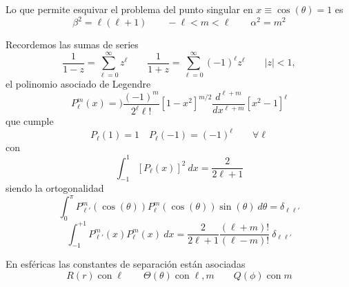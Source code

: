 \documentclass[10pt,oneside]{CBFT_book}
\begin{document}
Lo que permite esquivar el problema del punto singular en $x \equiv \cos(\theta)=1$ es
\[
	\beta^2 = \ell(\ell + 1) \qquad - \ell < m < \ell \qquad \alpha^2 = m^2
\]

Recordemos las sumas de series
\[
	\frac{1}{1-z} = \sum_{\ell=0}^{\infty} z^\ell \qquad \frac{1}{1+z} = \sum_{\ell=0}^{\infty} (-1)^\ell 
	z^\ell	\qquad |z|<1,
\]
el polinomio asociado de Legendre
\[
	P_\ell^m (x) =) \frac{(-1)^m}{2^\ell \ell!} [1-x^2]^{m/2} \frac{d^{\ell + m}}{dx^{\ell + m}} 
			[x^2 -1]^\ell
\]
que cumple
\[
	P_\ell (1) = 1 \quad P_\ell (-1) = (-1)^\ell \qquad  \forall \ell
\]
con 
\[
	\int_{-1}^1 [P_\ell (x)]^2 \: dx = \frac{2}{ 2\ell + 1 }
\]
siendo la ortogonalidad
\[
	\int_0^\pi P_{\ell'}^m (\cos(\theta)) P_\ell^m (\cos(\theta)) \sin(\theta) \: d\theta = 
	\delta_{\ell\ell'}
\]
\[
	\int_{-1}^{+1} P_{\ell'}^m (x) P_\ell^m (x) \: dx= \frac{2}{2\ell + 1}
	\frac{(\ell + m)!}{(\ell - m)!} \: \delta_{\ell\ell'}
\]

En esféricas las constantes de separación están asociadas
\[
	R(r) \; \mathrm{con} \; \ell \qquad \Theta(\theta) \; \mathrm{con} \; \ell,m \qquad
	Q(\phi) \; \mathrm{con} \; m
\]
\end{document}
